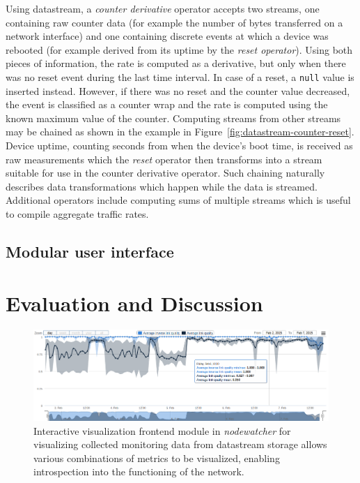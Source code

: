 \documentclass[5p,sort&compress]{elsarticle}
\newcommand{\nodewatcher}{\textit{nodewatcher}}
\begin{document}
Using datastream, a \textit{counter derivative} operator accepts two streams, one containing raw counter data (for example the number of bytes transferred on a network interface) and one containing discrete events at which a device was rebooted (for example derived from its uptime by the \textit{reset operator}).
Using both pieces of information, the rate is computed as a derivative, but only when there was no reset event during the last time interval.
In case of a reset, a \texttt{null} value is inserted instead.
However, if there was no reset and the counter value decreased, the event is classified as a counter wrap and the rate is computed using the known maximum value of the counter.
Computing streams from other streams may be chained as shown in the example in Figure~\ref{fig:datastream-counter-reset}.
Device uptime, counting seconds from when the device's boot time, is received as raw measurements which the \textit{reset} operator then transforms into a stream suitable for use in the counter derivative operator.
Such chaining naturally describes data transformations which happen while the data is streamed.
Additional operators include computing sums of multiple streams which is useful to compile aggregate traffic rates.

\subsection{Modular user interface}


\section{Evaluation and Discussion}
\label{sec:evaluation}

\begin{figure}
  \centering
  \includegraphics[scale=0.45]{figures/implementation-interactive-visualization.png}
  \caption{Interactive visualization frontend module in \nodewatcher{} for visualizing collected monitoring data from datastream storage allows various combinations of metrics to be visualized, enabling introspection into the functioning of the network.}
  \label{fig:interactive-visualization}
\end{figure}
\end{document}
